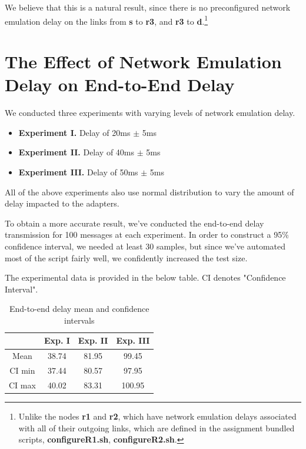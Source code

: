 \documentclass[conference]{IEEEtran}
\begin{document}
We believe that this is a natural result, since there is no preconfigured network emulation delay
on the links from \textbf{s} to \textbf{r3}, and \textbf{r3} to \textbf{d}.\footnote{Unlike the
nodes \textbf{r1} and \textbf{r2}, which have network emulation delays associated with all of
their outgoing links, which are defined in the assignment bundled scripts,
\textbf{configureR1.sh}, \textbf{configureR2.sh}.}

\section{The Effect of Network Emulation Delay on End-to-End Delay}

We conducted three experiments with varying levels of network emulation delay.

\begin{itemize}
    \item \textbf{Experiment I.} Delay of 20ms $\pm$ 5ms
    \item \textbf{Experiment II.} Delay of 40ms $\pm$ 5ms
    \item \textbf{Experiment III.} Delay of 50ms $\pm$ 5ms
\end{itemize}

All of the above experiments also use normal distribution to vary the amount of delay impacted to
the adapters.

To obtain a more accurate result, we've conducted the end-to-end delay transmission for 100 messages
at each experiment. In order to construct a 95\% confidence interval, we needed at least 30 samples,
but since we've automated most of the script fairly well, we confidently increased the test size.

The experimental data is provided in the below table. CI denotes "Confidence Interval".

\begin{table}[h]
    \centering
\renewcommand{\arraystretch}{2.5}
    \begin{tabular}{|c|c|c|c|}
\hline
              & Exp. I & Exp. II & Exp. III \\
\hline
        Mean  & 38.74  & 81.95   & 99.45 \\
\hline
        CI min & 37.44 & 80.57 & 97.95 \\
\hline
        CI max & 40.02 & 83.31 & 100.95 \\
\hline
    \end{tabular}
    \caption{End-to-end delay mean and confidence intervals}
    \label{table:data}
\end{table}
\end{document}
